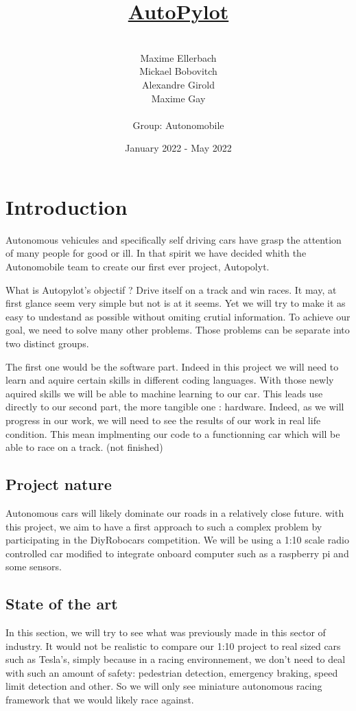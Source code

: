 \documentclass[12pt]{article}
\title{\underline{AutoPylot}}
\date{January 2022 - May 2022}
\author{%
    \\
    Maxime Ellerbach \\
    Mickael Bobovitch \\
    Alexandre Girold \\
    Maxime Gay \\ \\
    Group: Autonomobile 
    }
\begin{document}
\maketitle
\newpage

\tableofcontents
\newpage

\section{Introduction}
Autonomous vehicules and specifically self driving cars have grasp the attention of many people for good or ill. In that spirit we have decided whith the Autonomobile team to create our first ever project, Autopolyt.

	What is Autopylot's objectif ? Drive itself on a track and win races. It may, at first glance seem very simple but not is at it seems. Yet we will try to make it as easy to undestand as possible without omiting crutial information. To achieve our goal, we need to solve many other problems. Those problems can be separate into two distinct groups. 
    
The first one would be the software part. Indeed in this project we will need to learn and aquire certain skills in different coding languages. With those newly aquired skills we will be able to machine learning to our car. This leads use directly to our second part, the more tangible one : hardware. Indeed, as we will progress in our work, we will need to see the results of our work in real life condition. This mean implmenting our code to a functionning car which will be able to race on a track. (not finished)

\subsection{Project nature}
Autonomous cars will likely dominate our roads in a relatively close future.
with this project, we aim to have a first approach to such a complex problem by participating in the DiyRobocars competition.
We will be using a 1:10 scale radio controlled car modified to integrate onboard computer such as a raspberry pi and some sensors.

\subsection{State of the art}
In this section, we will try to see what was previously made in this sector of industry.
It would not be realistic to compare our 1:10 project to real sized cars such as Tesla's, simply because in a racing environnement,
we don't need to deal with such an amount of safety: pedestrian detection, emergency braking, speed limit detection and other.
So we will only see miniature autonomous racing framework that we would likely race against.\\
\end{document}
